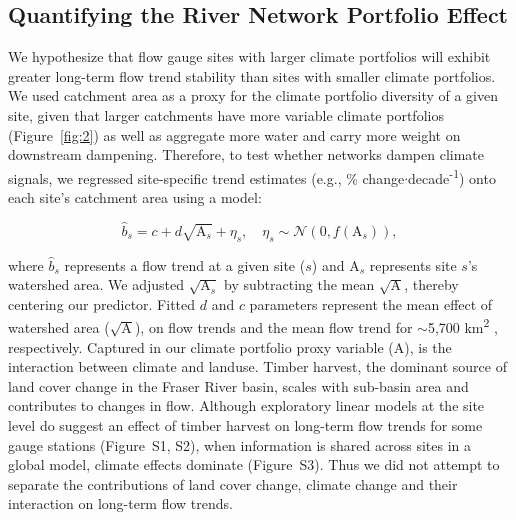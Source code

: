 \documentclass{AGUJournal}
\begin{document}
\subsection{Quantifying the River Network Portfolio Effect}

We hypothesize that flow gauge sites with larger climate portfolios will exhibit greater long-term flow trend stability than sites with smaller climate portfolios. We used catchment area as a proxy for the climate portfolio diversity of a given site, given that larger catchments have more variable climate portfolios (Figure~\ref{fig:2}) as well as aggregate more water and carry more weight on downstream dampening. Therefore, to test whether networks dampen climate signals, we regressed site-specific trend estimates (e.g., \% change$\cdot$decade\textsuperscript{-1}) onto each site's catchment area using a  model:
\begin{linenomath*}
\begin{equation}
	\hat{b}_{s} = c + d\sqrt{\mathrm{A}_{s}} + \eta_{s}, \quad
  \eta_{s} \sim \mathcal{N}(0, f(\mathrm{A}_{s})) \label{eq3},
\end{equation}
\end{linenomath*}
where $\hat{b}_{s}$ represents a flow trend at a given site ($s$) and $\mathrm{A}_{s}$ represents site $s$'s watershed area. We adjusted $\sqrt{\mathrm{A}_{s}}$ by subtracting the mean $\sqrt{\mathrm{A}}$, thereby centering our predictor. Fitted $d$ and $c$ parameters represent the mean effect of watershed area ($\sqrt{\mathrm{A}}$), on flow trends and the mean flow trend for  $\sim$5,700 km\textsuperscript{2}\added{)} , respectively. Captured in our climate portfolio proxy variable ($\mathrm{A}$), is the interaction between climate and landuse. Timber harvest, the dominant source of land cover change in the Fraser River basin, scales with sub-basin area and contributes to changes in flow. Although exploratory linear models at the site level do suggest an effect of timber harvest on long-term flow trends for some gauge stations (Figure~S1, S2), when information is shared across sites in a global model, climate effects dominate (Figure~S3). Thus we did not attempt to separate the contributions of land cover change, climate change and their interaction on long-term flow trends.
\end{document}
